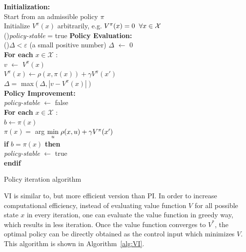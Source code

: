 \begin{algorithm}
	\textbf{Initialization:} \\
	Start from an admissible policy $ \pi $\\
	Initialize $V^{\pi}(x)$ arbitrarily, e.g. $ V^{\pi}(x) = 0 \hspace{2mm}  \forall x \in \mathcal{X} $ \\
	\Repeat(){\textit{policy-stable} = true}{	
	\textbf{Policy Evaluation:} \\
		\Repeat(){$ \Delta  <  \varepsilon $ (a small positive number)}{
		$ \Delta $ $ \leftarrow $ 0 \\
		\textbf{For each} $ x \in \mathcal{X} $ :\\
			\hspace{5mm} $ v $ $ \leftarrow $ $ V^{\pi}(x) $ \\
			\hspace{5mm} $ V^{\pi}(x) \leftarrow \rho(x, \pi(x)) +\gamma V^{\pi}(x') $ \\
			\hspace{5mm} $ \Delta = $ max$ (\Delta, |v-V^{\pi}(x)|) $ \\}
			\vspace{2mm}
	\textbf{Policy Improvement:} \\
		\textit{policy-stable} $ \leftarrow $ false \\
		\textbf{For each} $ x \in \mathcal{X} $ : \\
			\hspace{5mm} $ b \leftarrow \pi(x) $ \\
			\hspace{5mm} $ \pi(x)=$  arg $\underset{u}{\text{min}} \hspace{1mm} \rho(x, u) +\gamma V^{\pi}(x') $  \\
			\hspace{5mm} \textbf{if} $ b = \pi(x) $ \textbf{then} \\ 
			\hspace{10mm} \textit{policy-stable} $ \leftarrow $ true \\
			\hspace{5mm} \textbf{endif}
	}
\caption{Policy iteration algorithm}
\label{alg:PI}
\end{algorithm}

\ac{VI} is similar to, but more efficient version than \ac{PI}. In order to increase computational efficiency, instead of evaluating value function $V$ for all possible state $x$ in every iteration, one can evaluate the value function in greedy way, which results in less iteration. Once the value function converges to $V^*$, the optimal policy can be directly obtained as the control input which minimizes $V$. This algorithm is shown in Algorithm~\ref{alg:VI}. 

